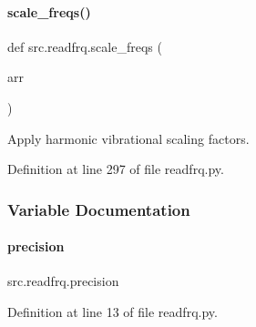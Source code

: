 \paragraph{\texorpdfstring{scale\+\_\+freqs()}{scale\_freqs()}}
{\footnotesize\ttfamily def src.\+readfrq.\+scale\+\_\+freqs (\begin{DoxyParamCaption}\item[{}]{arr }\end{DoxyParamCaption})}



Apply harmonic vibrational scaling factors. 



Definition at line 297 of file readfrq.\+py.



\subsubsection{Variable Documentation}
\mbox{\label{namespacesrc_1_1readfrq_a7bb7119f24be0beb36af3c38a07aea38}} 
\paragraph{\texorpdfstring{precision}{precision}}
{\footnotesize\ttfamily src.\+readfrq.\+precision}



Definition at line 13 of file readfrq.\+py.

